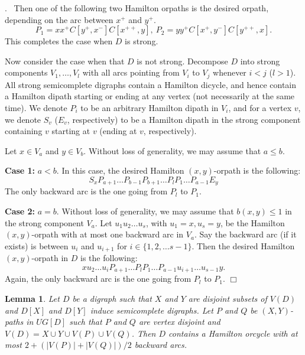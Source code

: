 \documentclass{article}
\newcommand{\2}{\vspace{2mm}}
\renewenvironment{proof}[1][]{\par \noindent {\bf Proof#1}.\ }{\hfill$\Box$
\par \vspace{11pt}}
\newtheorem{lemma}[theorem]{Lemma}
\theoremstyle{definition}
\begin{document}
\begin{proof}
Then one of the following two Hamilton orpaths is the desired orpath, depending on the arc between $x^+$ and $y^+$.
\[
P_1=x x^+ C[y^+, x^-] C[x^{++}, y], ~P_2=y y^+ C[x^+, y^-]C[y^{++}, x]
.\]
This completes the case when $D$ is strong.

Now consider the case when that $D$ is not strong.
Decompose $D$ into strong components $V_1,\dots,V_l$ with all arcs pointing from $V_i$ to $V_j$ whenever $i<j$ ($l>1$). All strong semicomplete digraphs contain a Hamilton dicycle, and hence contain a Hamilton dipath starting or ending at any vertex (not necessarily at the same time). We denote $P_i$ to be an arbitrary Hamilton dipath in $V_i$, and for a vertex $v$, we denote $S_v$ ($E_v$, respectively) to be a Hamilton dipath in the strong component containing $v$ starting at $v$ (ending at $v$, respectively).

Let $x \in V_a$ and $y \in V_b$.
Without loss of generality, we may assume that $a \le b$.

\textbf{Case 1:} $a<b$.
In this case, the desired Hamilton $(x,y)$-orpath is the following:
\[
S_xP_{a+1}\dots P_{b-1}P_{b+1}\dots P_lP_1 \dots P_{a-1}E_y
\]
The only backward arc is the one going from $P_l$ to $P_1$.

\textbf{Case 2:} $a=b$. %
Without loss of generality, we may assume that $b(x,y)\le 1$ in the strong component $V_a$.
Let $u_1u_2\dots u_s$, with $u_1=x, u_s=y$, be the Hamilton $(x,y)$-orpath with at most one backward arc in $V_a$.
Say the backward arc (if it exists) is between $u_i$ and $u_{i+1}$ for $i \in \{1,2,\dots s-1 \}$. 
Then the desired Hamilton $(x,y)$-orpath in $D$ is the following:
\[
xu_2\dots u_{i}P_{a+1}\dots P_lP_1 \dots P_{a-1}u_{i+1}\dots u_{s-1}y.
\]
Again, the only backward arc is the one going from $P_l$ to $P_1$.
\end{proof}   

\begin{lemma}\label{lem: TwoSemiC}
Let $D$ be a digraph such that $X$ and $Y$ are disjoint subsets of $V(D)$ and $D[X]$ and $D[Y]$ induce semicomplete digraphs.
Let $P$ and $Q$ be $(X,Y)$-paths in $UG[D]$  such that $P$ and $Q$ are vertex disjoint and 
$V(D) = X \cup Y \cup V(P) \cup V(Q)$. 
Then $D$ contains a Hamilton orcycle with at most $2 + (|V(P)|+|V(Q)|)/2$ backward arcs.
\end{lemma} 
\end{document}

